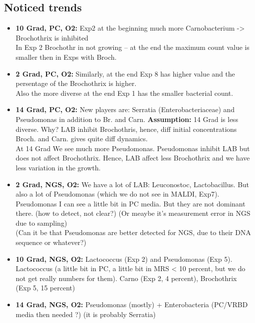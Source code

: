 \documentclass[10pt,A4paper]{article}
\begin{document}
\subsection{Noticed trends}
\begin{itemize}
    \item \textbf{10 Grad, PC, O2:} Exp2 at the beginning much more Carnobacterium -> Brochothrix is inhibited\\
    In Exp 2 Brochothr in not growing --  at the end the maximum count value is smaller then in Exps with Broch.

    \item \textbf{2 Grad, PC, O2:} Similarly, at the end Exp 8 has higher value and the persentage of the Brochothrix is higher.\\
    Also the more diverse at the end Exp 1 has the smaller bacterial count. 

    \item \textbf{14 Grad, PC, O2:} New players are: Serratia (Enterobacteriaceae) and Pseudomonas in addition to Br. and Carn.
    \textbf{Assumption:} 14 Grad is less diverse. Why? LAB inhibit Brochothris, hence, diff initial concentrations Broch. and Carn. gives quite diff dynamics.\\
    At 14 Grad We see much more Pseudomonas. Pseudomonas inhibit LAB but does not affect Brochothrix.
    Hence, LAB affect less Brochothrix and we have less variation in the growth.
\end{itemize}

\begin{itemize}
    \item \textbf{2 Grad, NGS, O2:} We have a lot of LAB: Leuconostoc, Lactobacillus. But also a lot of Pseudomonas (which we do not see in MALDI, Exp7).
    Pseudomonas I can see a little bit in PC media. But they are not dominant there. (how to detect, not clear?) (Or meaybe it's measurement error in NGS due to sampling) \\
    (Can it be that Pseudomonas are better detected for NGS, due to their DNA sequence or whatever?)

    \item  \textbf{10 Grad, NGS, O2:} Lactococcus (Exp 2) and Pseudomonas (Exp 5). \\
    Lactococcus (a little bit in PC, a little bit in MRS < 10 percent, but we do not get really numbers for them).
    Carno (Exp 2, 4 percent), Brochothrix (Exp 5, 15 percent)

    \item \textbf{14 Grad, NGS, O2:} Pseudomonas (mostly) + Enterobacteria (PC/VRBD media then needed ?) (it is probably Serratia)
\end{itemize}
\end{document}
